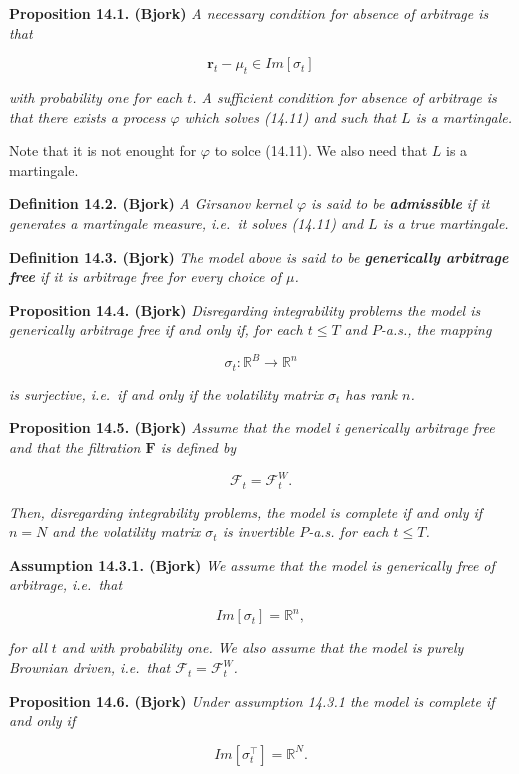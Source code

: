 \documentclass[a4paper,12pt,openany]{book}
\begin{document}
\textbf{Proposition 14.1. (Bjork)} \emph{A necessary condition for absence of arbitrage is that}

\[
\mathbf{r}_t-\mu_t\in Im[\sigma_t]
\]

\emph{with probability one for each \(t\). A sufficient condition for absence of arbitrage is that there exists a process \(\varphi\) which solves (14.11) and such that \(L\) is a martingale.}

Note that it is not enought for \(\varphi\) to solce (14.11). We also need that \(L\) is a martingale.

\textbf{Definition 14.2. (Bjork)} \emph{A Girsanov kernel \(\varphi\) is said to be \textbf{admissible} if it generates a martingale measure, i.e.~it solves (14.11) and \(L\) is a true martingale.}

\textbf{Definition 14.3. (Bjork)} \emph{The model above is said to be \textbf{generically arbitrage free} if it is arbitrage free for every choice of \(\mu\).}

\textbf{Proposition 14.4. (Bjork)} \emph{Disregarding integrability problems the model is generically arbitrage free if and only if, for each \(t\le T\) and \(P\)-a.s., the mapping}

\[
\sigma_t : \mathbb{R}^B\to \mathbb{R}^n
\]

\emph{is surjective, i.e.~if and only if the volatility matrix \(\sigma_t\) has rank \(n\).}

\textbf{Proposition 14.5. (Bjork)} \emph{Assume that the model i generically arbitrage free and that the filtration \(\mathbf{F}\) is defined by}

\[
\mathcal{F}_t=\mathcal{F}^W_t.\tag{14.14}
\]

\emph{Then, disregarding integrability problems, the model is complete if and only if \(n=N\) and the volatility matrix \(\sigma_t\) is invertible \(P\)-a.s. for each \(t\le T\).}

\textbf{Assumption 14.3.1. (Bjork)} \emph{We assume that the model is generically free of arbitrage, i.e.~that}

\[
Im[\sigma_t]=\mathbb{R}^n,\tag{14.16}
\]

\emph{for all \(t\) and with probability one. We also assume that the model is purely Brownian driven, i.e.~that \(\mathcal{F}_t=\mathcal{F}_t^W\).}

\textbf{Proposition 14.6. (Bjork)} \emph{Under assumption 14.3.1 the model is complete if and only if}

\[
Im[\sigma_t^\top]=\mathbb{R}^N.\tag{14.23}
\]
\end{document}
